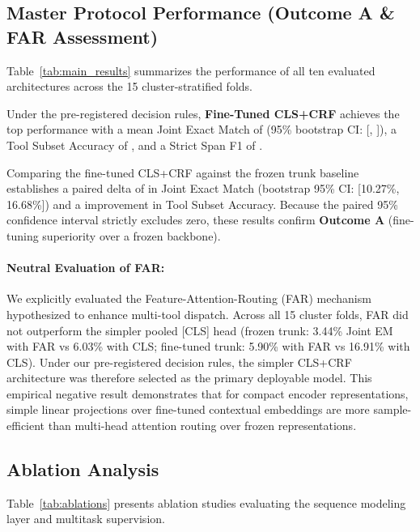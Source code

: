 \documentclass[letterpaper]{article}
\begin{document}
\subsection{Master Protocol Performance (Outcome A \& FAR Assessment)}

Table~\ref{tab:main_results} summarizes the performance of all ten evaluated architectures across the 15 cluster-stratified folds.

Under the pre-registered decision rules, \textbf{Fine-Tuned CLS+CRF} achieves the top performance with a mean Joint Exact Match of \textbf{\PrimaryJointEM} (95\% bootstrap CI: [\PrimaryJointEMCILow, \PrimaryJointEMCIHigh]), a Tool Subset Accuracy of \textbf{\PrimaryToolAcc}, and a Strict Span F1 of \textbf{\PrimaryStrictFOne}.

Comparing the fine-tuned CLS+CRF against the frozen trunk baseline establishes a paired delta of \textbf{\FineTuningJointEMDelta} in Joint Exact Match (bootstrap 95\% CI: [10.27\%, 16.68\%]) and a \textbf{\FineTuningToolAccDelta} improvement in Tool Subset Accuracy. Because the paired 95\% confidence interval strictly excludes zero, these results confirm \textbf{Outcome A} (fine-tuning superiority over a frozen backbone).

\paragraph{Neutral Evaluation of FAR:} We explicitly evaluated the Feature-Attention-Routing (FAR) mechanism hypothesized to enhance multi-tool dispatch. Across all 15 cluster folds, FAR did not outperform the simpler pooled [CLS] head (frozen trunk: 3.44\% Joint EM with FAR vs 6.03\% with CLS; fine-tuned trunk: 5.90\% with FAR vs 16.91\% with CLS). Under our pre-registered decision rules, the simpler CLS+CRF architecture was therefore selected as the primary deployable model. This empirical negative result demonstrates that for compact encoder representations, simple linear projections over fine-tuned contextual embeddings are more sample-efficient than multi-head attention routing over frozen representations.

\subsection{Ablation Analysis}



Table~\ref{tab:ablations} presents ablation studies evaluating the sequence modeling layer and multitask supervision.
\end{document}

